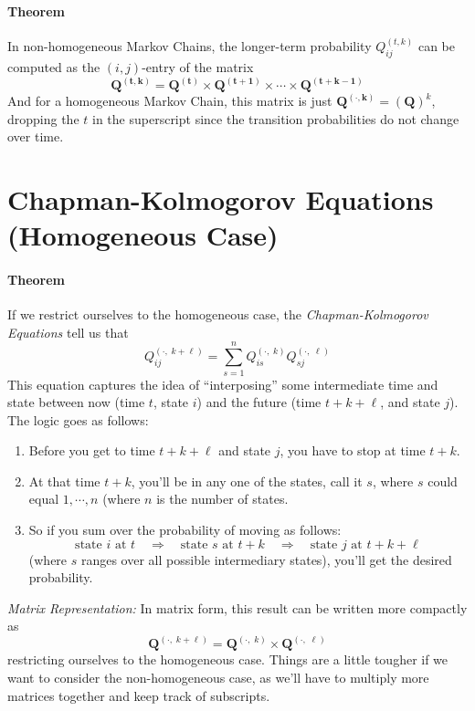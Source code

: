\documentclass[12pt]{article}
\theoremstyle{plain}
\theoremstyle{definition}
\theoremstyle{remark}
\begin{document}
\paragraph{Theorem} In non-homogeneous Markov Chains, the longer-term
probability $Q^{(t,k)}_{ij}$ can be computed as the $(i,j)$-entry of
the matrix 
   \[\mathbf{Q^{(t,k)}}= \mathbf{Q^{(t)}} \times \mathbf{Q^{(t+1)}} \times
      \cdots \times \mathbf{Q^{(t+k-1)}} 
            \]
And for a homogeneous Markov Chain, this matrix is just 
$\mathbf{Q^{(\cdot, k)}} = \left(\mathbf{Q}\right)^k$, dropping the
$t$ in the superscript since the transition probabilities do not 
change over time.

\section{Chapman-Kolmogorov Equations (Homogeneous Case)}

\paragraph{Theorem} If we restrict ourselves to the 
homogeneous case, 
the {\sl Chapman-Kolmogorov Equations} tell us that 
\[Q^{(\cdot, \; k+\ell)}_{ij} = \sum^n_{s=1} 
    Q^{(\cdot, \; k)}_{is} Q^{(\cdot,\; \ell)}_{sj} \]
This equation captures the idea of ``interposing'' some
intermediate time and state between now (time $t$, state
$i$) and the future (time $t+k+\ell$, and state $j$).
The logic goes as follows:
\begin{enumerate}
    \item Before you get to time $t+k+\ell$ and state $j$, you
	have to stop at time $t+k$.   
    \item At that time $t+k$, you'll be in any one of the states,
	call it $s$, where $s$ could equal $1, \cdots, n$ (where
	$n$ is the number of states.
    \item So if you sum over the probability
	of moving as follows: 
	\[  \text{state $i$ at $t$} \quad \Rightarrow \quad
	    \text{state $s$ at $t+k$} \quad \Rightarrow \quad 
	    \text{state $j$ at $t+k+\ell$} \]
	(where $s$ ranges over all possible intermediary states), 
	you'll get the desired probability.
\end{enumerate}
{\sl Matrix Representation:}
In matrix form, this result can be written more compactly as
    \[ \mathbf{Q}^{(\cdot,\; k+\ell)} = \mathbf{Q}^{(\cdot,\; k)} \times 
      \mathbf{Q}^{(\cdot,\; \ell)}\]
restricting ourselves to the homogeneous case.
Things are a little tougher if we want to consider the 
non-homogeneous case, as we'll have to multiply more matrices 
together and keep track of subscripts.
\end{document}
